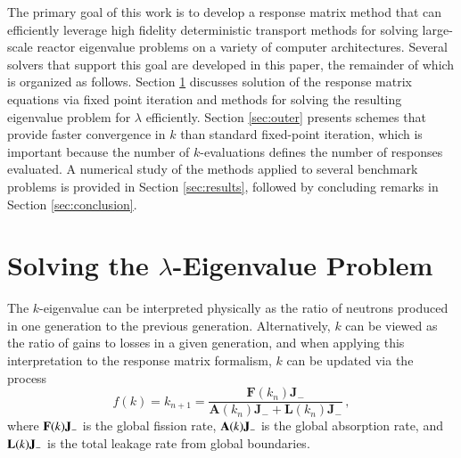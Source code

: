 The primary goal of this work is to develop a response matrix method that
can efficiently leverage high fidelity deterministic transport methods for 
solving large-scale reactor eigenvalue problems on a variety of computer 
architectures.  
Several solvers that support this goal are developed in this paper, 
the remainder of which is organized as follows.
 Section \ref{sec:inner}
discusses solution of the response matrix equations via fixed point 
iteration and methods for solving the resulting eigenvalue problem 
for $\lambda$ efficiently.  Section \ref{sec:outer} presents schemes 
that provide faster convergence in $k$ than standard fixed-point iteration,
which is important because the number of $k$-evaluations defines the 
number of responses evaluated.  A numerical study 
of the methods applied to several benchmark problems is 
provided in Section \ref{sec:results}, followed by concluding remarks in
Section \ref{sec:conclusion}.


\section{Solving the $\lambda$-Eigenvalue Problem}
\label{sec:inner}

The $k$-eigenvalue can be interpreted physically as the ratio of neutrons
produced in one generation to the previous generation. 
Alternatively, $k$ can be viewed as the ratio of gains to losses in a given 
generation, and when applying this interpretation to the response matrix 
formalism, $k$ can be updated via the process
\begin{equation}
 f(k) = k_{n+1} = \frac{\mathbf{F}(k_{n})\mathbf{J}_{-}} 
  { \mathbf{A}(k_{n}) \mathbf{J}_{-} + \mathbf{L}(k_{n}) \mathbf{J}_{-} }\, ,
\label{eq:picard}
\end{equation}
where $\mathbf{F}(k)\mathbf{J}_{-}$ is the global fission rate, 
$\mathbf{A}(k) \mathbf{J}_{-}$ is the global absorption rate,
and $\mathbf{L}(k) \mathbf{J}_{-}$ is the total leakage rate
from global boundaries.

